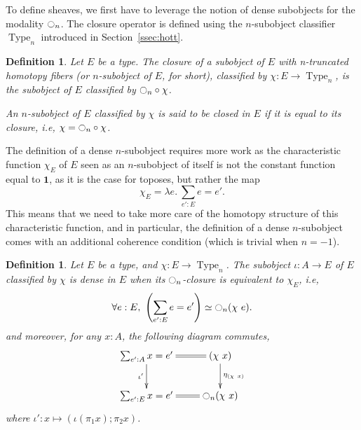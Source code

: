 \documentclass[conference]{IEEEtran}
\newtheorem{defi}[thm]{Definition}
\newcommand{\ie}{i.e,\xspace}
\DeclareMathOperator{\Type}{Type}
\DeclareMathOperator{\HProp}{HProp}
\newcommand{\modal}{\ensuremath{\ocircle}}
\newcommand \one {\mathbf{1}}
\begin{document}


To define sheaves, we first have to leverage the notion of dense
subobjects for the modality $\modal_n$. The closure operator is defined
using the $n$-subobject classifier $\Type_n$ introduced in
Section~\ref{ssec:hott}.

\begin{defi}
  Let $E$ be a type. The {\em closure} of a subobject of $E$ with
  n-truncated homotopy fibers (or $n$-subobject of $E$, for short),
  classified by $\chi : E \to \Type_n$, is the subobject of $E$
  classified by $\modal_n \circ \chi$.

  An $n$-subobject of $E$ classified by $\chi$ is said to be {\em
    closed in $E$} if it is equal to its closure, \ie
  $\chi = \modal_n \circ \chi$.
\end{defi}

The definition of a dense $n$-subobject requires more work as the
characteristic function $\chi_E$ of $E$ seen as an $n$-subobject of
itself is not the constant function equal to $\one$, as it is the case
for toposes, but rather the map 
%
$$\chi_E  = \lambda e . \ \sum_{e':E} e=e'.$$
%
This means that we need to take more care of the homotopy structure of
this characteristic function, and in particular, the definition of a
dense $n$-subobject comes with an additional coherence condition
(which is trivial when $n=-1$).

\begin{defi}
  Let $E$ be a type, and $\chi:E \to \Type_n$. The subobject $\iota :
  A \to E$ of $E$
  classified by $\chi$ is {\em dense} in $E$ when its $\modal_n$-closure
  is equivalent to $\chi_E$, \ie
  $$\forall e:E,~ \left(\sum_{e':E} e=e'\right) \simeq \modal_n
  (\chi~e).$$
  and moreover, for any $x:A$, the following diagram 
  commutes, 
  $$\xymatrix{
    \sum_{e':A} x = e' \ar@{=}[r] \ar[d]_{\iota'} & (\chi \ x)
    \ar[d]^{\eta_{(\chi \ x)}}\\
    \sum_{e':E} x = e' \ar@{=}[r] & \modal_n (\chi \ x)
  }$$
  where $\iota': x \mapsto (\iota (\pi_1 x) ; \pi_2 x)$.
\end{defi}
\end{document}
